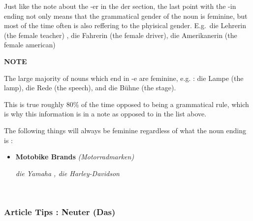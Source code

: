 \documentclass[a4paper,twocolumn,10pt]{article}
\newcommand{\newpar}
{\par \vspace{0.3cm}}
\newcommand{\subsubsectionend}
{
\nolinenumbers
\linenumbers
}
\newcommand{\tcolorboxstart}
{
	\nolinenumbers
	\vspace{0.2cm}
	\centering
}
\newcommand{\tcolorboxend}
{
	\justifying
	\vspace{0.2cm}
	\linenumbers
}
\newcommand{\tcolorboxnote}[1]
{

\tcolorboxstart
\begin{note-bg}

	\begin{note-theword}
		{\footnotesize \textbf{NOTE} }
	\end{note-theword}

	\begin{note-content} \justifying

		#1

	\end{note-content}

\end{note-bg}
\tcolorboxend
}
\begin{document}
\vspace{0.2cm}

\linenumbers


Just like the note about the -er in the der section, the last point with the -in
ending not only means that the grammatical gender of the noun is
feminine, but most of the time often is also reffering to the phyisical gender.
E.g.\ die Lehrerin (the female teacher) , die Fahrerin (the female driver), die
Amerikanerin (the female american)\newpar


\tcolorboxnote
{
	The large majority of nouns which end in -e
		are feminine, e.g. : die Lampe (the lamp), die Rede (the speech), and
		die Bühne (the stage).\newpar

		This is true roughly 80\% of the time opposed to being a grammatical
		rule, which is why this information is in a note as opposed to in the
		list above.



}




The following things will always be feminine regardless of what the noun ending
is :


\begin{itemize}[noitemsep]

	\item \textbf{Motobike Brands} \textit{ (Motorradmarken) }


\noindent
\textit{die Yamaha , die Harley-Davidson}\\





\end{itemize}




\


\subsubsectionend

\subsubsection{Article Tips : Neuter (Das)}
\label{sssec:article_tips_neuter_das_}
\end{document}
